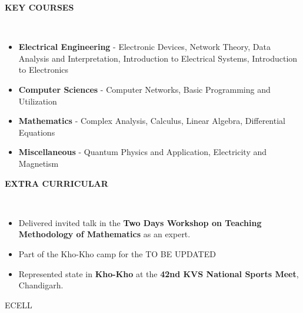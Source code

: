 \documentclass[a4paper,10pt]{article}
\newcommand{\lsep}{-0.5cm}
\newcommand{\resheading}[1]{{\small \colorbox{mygrey}{\begin{minipage}{0.975\textwidth}{\textbf{#1 \vphantom{p\^{E}}}}\end{minipage}}}}
\begin{document}
\resheading{\textbf{KEY COURSES} }\\[\lsep]
\begin{itemize}
\setlength\itemsep{0.1em}
\item \noindent \textbf{Electrical Engineering} - Electronic Devices, Network Theory, Data Analysis and Interpretation, Introduction to Electrical Systems, Introduction to Electronics
\item \noindent \textbf{Computer Sciences} - Computer Networks, Basic Programming and Utilization
\item \noindent \textbf{Mathematics} - Complex Analysis, Calculus, Linear Algebra, Differential Equations
\item \noindent \textbf{Miscellaneous} - Quantum Physics and Application, Electricity and Magnetism

\end{itemize}

\resheading{\textbf{EXTRA CURRICULAR} }\\[\lsep]
\begin{itemize}
\setlength\itemsep{0.1em}
\item \noindent Delivered invited talk in the \textbf{Two Days Workshop on Teaching Methodology of Mathematics} as an expert.
\item \noindent Part of the Kho-Kho camp for the  TO BE UPDATED
\item \noindent Represented state in \textbf{Kho-Kho} at the \textbf{42nd KVS National Sports Meet}, Chandigarh.


\end{itemize}
ECELL
\end{document}
